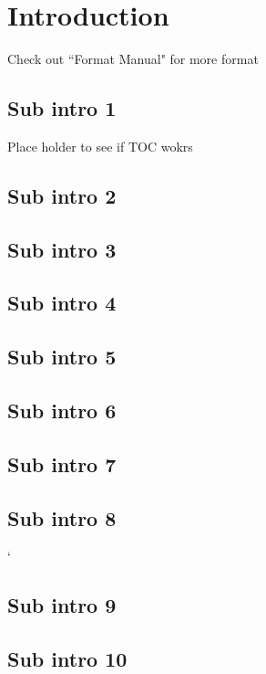 \fancyhf{}
\fancyfoot[C]{ \thepage}


\chapter[Introduction]{Introduction}
\label{Introduction}
Check out ``Format Manual" for more format\cite{asu2023}
\section{Sub intro 1}
Place holder to see if TOC wokrs
\section{Sub intro 2}
\section{Sub intro 3}
\section{Sub intro 4}
\section{Sub intro 5}
\section{Sub intro 6}
\section{Sub intro 7}
\section{Sub intro 8}`
\section{Sub intro 9}
\section{Sub intro 10}

